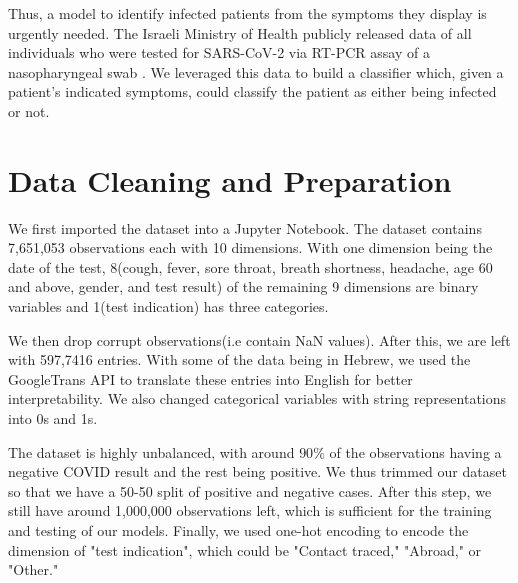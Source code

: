 \documentclass[a4paper, 11pt]{article}
\begin{document}
Thus, a model to identify infected patients from the symptoms they display is urgently needed. The Israeli Ministry of Health publicly released data of all individuals who were tested for SARS-CoV-2 via RT-PCR assay of a nasopharyngeal swab \cite{data}. We leveraged this data to build a classifier which, given a patient's indicated symptoms, could classify the patient as either being infected or not.


\section*{Data Cleaning and Preparation}
We first imported the dataset into a Jupyter Notebook. The dataset contains 7,651,053 observations each with 10 dimensions. With one dimension being the date of the test, 8(cough, fever, sore throat, breath shortness, headache, age 60 and above, gender, and test result) of the remaining 9 dimensions are binary variables and 1(test indication) has three categories. \par
We then drop corrupt observations(i.e contain NaN values). After this, we are left with 597,7416 entries. With some of the data being in Hebrew, we used the GoogleTrans API to translate these entries into English for better interpretability. We also changed categorical variables with string representations into 0s and 1s. \par
The dataset is highly unbalanced, with around $90\%$ of the observations having a negative COVID result and the rest being positive. We thus trimmed our dataset so that we have a 50-50 split of positive and negative cases. After this step, we still have around 1,000,000 observations left, which is sufficient for the training and testing of our models.
Finally, we used one-hot encoding to encode the dimension of "test indication", which could be "Contact traced," "Abroad," or "Other."
\end{document}
